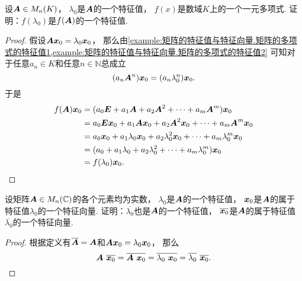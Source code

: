 \begin{example}\label{example:矩阵的特征值与特征向量.矩阵的多项式的特征值4}
设\(\boldsymbol{A} \in M_n(K)\)，
\(\lambda_0\)是\(\boldsymbol{A}\)的一个特征值，
\(f(x)\)是数域\(K\)上的一个一元多项式.
证明：\(f(\lambda_0)\)是\(f(\boldsymbol{A})\)的一个特征值.
\begin{proof}
假设\(\boldsymbol{A} \boldsymbol{x}_0 = \lambda_0 \boldsymbol{x}_0\)，
那么由\cref{example:矩阵的特征值与特征向量.矩阵的多项式的特征值1,example:矩阵的特征值与特征向量.矩阵的多项式的特征值2}
可知对于任意\(a_n \in K\)和任意\(n\in\mathbb{N}\)总成立\begin{equation*}
	(a_n \boldsymbol{A}^n) \boldsymbol{x}_0
	= (a_n \lambda_0^n) \boldsymbol{x}_0.
\end{equation*}
于是\begin{align*}
	f(\boldsymbol{A}) \boldsymbol{x}_0
	&= (a_0 \boldsymbol{E} + a_1 \boldsymbol{A} + a_2 \boldsymbol{A}^2 + \dotsb + a_m \boldsymbol{A}^m) \boldsymbol{x}_0 \\
	&= a_0 \boldsymbol{E} \boldsymbol{x}_0 + a_1 \boldsymbol{A} \boldsymbol{x}_0 + a_2 \boldsymbol{A}^2 \boldsymbol{x}_0 + \dotsb + a_m \boldsymbol{A}^m \boldsymbol{x}_0 \\
	&= a_0 \boldsymbol{x}_0 + a_1 \lambda_0 \boldsymbol{x}_0 + a_2 \lambda_0^2 \boldsymbol{x}_0 + \dotsb + a_m \lambda_0^m \boldsymbol{x}_0 \\
	&= (a_0 + a_1 \lambda_0 + a_2 \lambda_0^2 + \dotsb + a_m \lambda_0^m) \boldsymbol{x}_0 \\
	&= f(\lambda_0) \boldsymbol{x}_0.
	\qedhere
\end{align*}
\end{proof}
\end{example}
\begin{example}
设矩阵\(\boldsymbol{A} \in M_n(\mathbb{C})\)的各个元素均为实数，
\(\lambda_0\)是\(\boldsymbol{A}\)的一个特征值，
\(\boldsymbol{x}_0\)是\(\boldsymbol{A}\)的属于特征值\(\lambda_0\)的一个特征向量.
证明：\(\overline{\lambda_0}\)也是\(\boldsymbol{A}\)的一个特征值，
\(\overline{\boldsymbol{x}_0}\)是\(\boldsymbol{A}\)的属于特征值\(\overline{\lambda_0}\)的一个特征向量.
\begin{proof}
根据定义有\(\overline{\boldsymbol{A}} = \boldsymbol{A}\)和\(\boldsymbol{A} \boldsymbol{x}_0 = \lambda_0 \boldsymbol{x}_0\)，
那么\[
	\boldsymbol{A}~\overline{\boldsymbol{x}_0}
	= \overline{\boldsymbol{A}~\boldsymbol{x}_0}
	= \overline{\lambda_0~\boldsymbol{x}_0}
	= \overline{\lambda_0}~\overline{\boldsymbol{x}_0}.
	\qedhere
\]
\end{proof}
\end{example}

